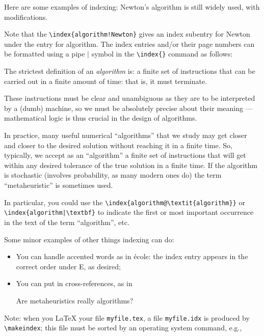 Here are some examples of indexing: Newton's algorithm is
still widely used, with modifications.

Note that the \verb|\index{algorithm!Newton}| gives an index subentry for Newton under the entry for algorithm.
The index entries and/or their page numbers can be formatted using a pipe $|$ symbol in the \verb!\index{}!
command as follows:

\begin{defn}
The strictest definition of an \emph{algorithm} is: a finite set of instructions
that can be carried out in a finite amount of time: that is, it must terminate.

These instructions must be clear and unambiguous as they are to be interpreted by a (dumb)
machine, so we must be absolutely precise about their meaning --- mathematical logic is
thus crucial in the design of algorithms.
\end{defn}

In practice, many useful numerical ``algorithms'' that we study may get closer and closer
to the desired solution without reaching it in a finite time.  So, typically, we accept as an
``algorithm'' a finite set of instructions that will get within any desired tolerance
of the true solution in a finite time.
If the algorithm is stochastic (involves probability, as many modern ones do) the term
``metaheuristic'' is sometimes used.

In particular, you could use the \verb|\index{algorithm@\textit{algorithm}}| or \verb!\index{algorithm|\textbf}! to
indicate the first or most important occurrence in the text of the term ``algorithm'', etc.

Some minor examples of other things indexing can do:
\begin{itemize}
\item You can handle accented words as in \'ecole: the index entry appears in the correct
order under E, as desired;
\item You can put in cross-references, as in

Are metaheuristics really algorithms?
\end{itemize}

Note: when you LaTeX your file \texttt{myfile.tex}, a file \texttt{myfile.idx} is produced by \verb|\makeindex|;
this file must be sorted by an operating system command, e.g.,

